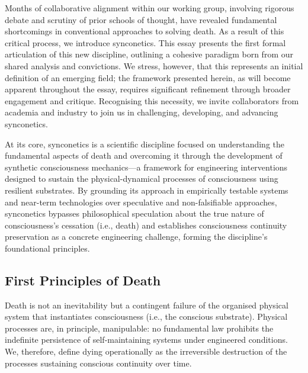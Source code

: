 \documentclass[10pt]{article}
\begin{document}
\begin{sloppypar}
  Months of collaborative alignment within our working group, involving rigorous debate and scrutiny of prior schools of thought, have revealed fundamental shortcomings in conventional approaches to solving death. As a result of this critical process, we introduce synconetics. This essay presents the first formal articulation of this new discipline, outlining a cohesive paradigm born from our shared analysis and convictions. We stress, however, that this represents an initial definition of an emerging field; the framework presented herein, as will become apparent throughout the essay, requires significant refinement through broader engagement and critique. Recognising this necessity, we invite collaborators from academia and industry to join us in challenging, developing, and advancing synconetics.

  At its core, synconetics is a scientific discipline focused on understanding the fundamental aspects of death and overcoming it through the development of synthetic consciousness mechanics—a framework for engineering interventions designed to sustain the physical-dynamical processes of consciousness using resilient substrates. By grounding its approach in empirically testable systems and near-term technologies over speculative and non-falsifiable approaches, synconetics bypasses philosophical speculation about the true nature of consciousness’s cessation (i.e., death) and establishes consciousness continuity preservation as a concrete engineering challenge, forming the discipline’s foundational principles.

  \subsection{First Principles of Death}
  \label{sec:first-principles}

  Death is not an inevitability but a contingent failure of the organised physical system that instantiates consciousness (i.e., the conscious substrate). Physical processes are, in principle, manipulable: no fundamental law prohibits the indefinite persistence of self-maintaining systems under engineered conditions. We, therefore, define dying operationally as the irreversible destruction of the processes sustaining conscious continuity over time.


\end{sloppypar}
\end{document}
